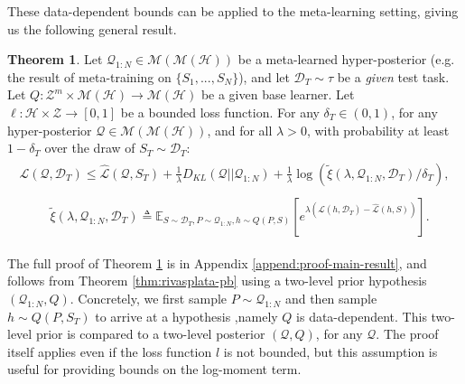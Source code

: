 \documentclass{article} %
\theoremstyle{definition}
\newtheorem{theorem}{Theorem}[section]
\newcommand{\Expect}[2]{\mathbb{E}_{#1}\left [#2 \right ]}
\begin{document}
These data-dependent bounds can be applied to the meta-learning setting, giving us the following general result. 
%
\begin{theorem} \label{thm:main-result}
	Let $\mathcal{Q}_{1:N}\in \mathcal{M}(\mathcal{M}(\mathcal{H}))$ be a meta-learned hyper-posterior (e.g. the result of meta-training on $\{S_1,...,S_N\}$), and let $\mathcal{D}_T\sim \tau$ be a \emph{given} test task. Let $Q: \mathcal{Z}^m\times\mathcal{M}(\mathcal{H})\rightarrow \mathcal{M}(\mathcal{H})$ be a given base learner. Let $\ell: \mathcal{H}\times \mathcal{Z}\rightarrow [0, 1]$ be a bounded loss function.
	For any $\delta_T \in (0,1)$, for any hyper-posterior $\mathcal{Q}\in \mathcal{M}(\mathcal{M}(\mathcal{H}))$, and for all $\lambda>0$, with probability at least $1-\delta_T$ over the draw of $S_T\sim \mathcal{D}_T$:
	\begin{align} \label{eq:main-result-generic}
	\begin{split}
	\mathcal{L}(\mathcal{Q}, \mathcal{D}_T) \leq \hat{\mathcal{L}}(\mathcal{Q}, S_T) + \frac{1}{\lambda}D_{KL}(\mathcal{Q}||\mathcal{Q}_{1:N})
	+\frac{1}{\lambda}\log\left ( \tilde{\xi}(\lambda,\mathcal{Q}_{1:N},\mathcal{D}_T)/\delta_T\right ) ,
	\end{split}
	\end{align}
	\begin{align*} 
	\begin{split}
	&\tilde{\xi}(\lambda,\mathcal{Q}_{1:N},\mathcal{D}_T)\triangleq 
	 \Expect{S\sim \mathcal{D}_T, P\sim \mathcal{Q}_{1:N}, h\sim Q(P,S)}{e^{\lambda\left (\mathcal{L}(h, \mathcal{D}_T)-\hat{\mathcal{L}}(h, S)\right )}} .
	\end{split}
	\end{align*}

\end{theorem}

The full proof of Theorem \ref{thm:main-result} is in Appendix \ref{append:proof-main-result}, and follows from Theorem \ref{thm:rivasplata-pb} using a two-level prior hypothesis $(\mathcal{Q}_{1:N}, Q)$. Concretely, we first sample $P\sim \mathcal{Q}_{1:N}$ and then sample $h\sim Q(P, S_T)$ to arrive at a hypothesis ,namely $Q$ is data-dependent. This two-level prior is compared to a two-level posterior $(\mathcal{Q}, Q)$, for any $\mathcal{Q}$. The proof itself applies even if the loss function $l$ is not bounded, but this assumption is useful for providing bounds on the log-moment term.
\end{document}
